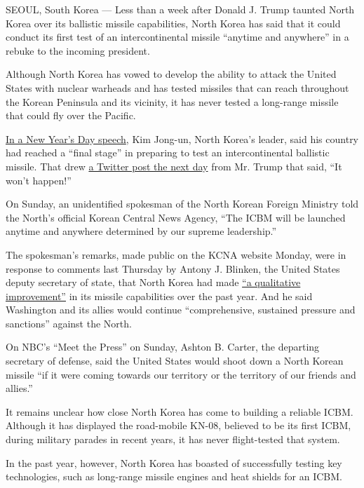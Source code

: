 SEOUL, South Korea --- Less than a week after Donald J. Trump taunted
North Korea over its ballistic missile capabilities, North Korea has
said that it could conduct its first test of an intercontinental missile
``anytime and anywhere'' in a rebuke to the incoming president.

Although North Korea has vowed to develop the ability to attack the
United States with nuclear warheads and has tested missiles that can
reach throughout the Korean Peninsula and its vicinity, it has never
tested a long-range missile that could fly over the Pacific.

\href{http://www.nytimes3xbfgragh.onion/2017/01/01/world/asia/north-korea-intercontinental-ballistic-missile-test-kim-jong-un.html}{In
a New Year's Day speech}, Kim Jong-un, North Korea's leader, said his
country had reached a ``final stage'' in preparing to test an
intercontinental ballistic missile. That drew
\href{http://www.nytimes3xbfgragh.onion/2017/01/02/world/asia/trump-twitter-north-korea-missiles-china.html}{a
Twitter post the next day} from Mr. Trump that said, ``It won't
happen!''

On Sunday, an unidentified spokesman of the North Korean Foreign
Ministry told the North's official Korean Central News Agency, ``The
ICBM will be launched anytime and anywhere determined by our supreme
leadership.''

The spokesman's remarks, made public on the KCNA website Monday, were in
response to comments last Thursday by Antony J. Blinken, the United
States deputy secretary of state, that North Korea had made
\href{https://www.state.gov/s/d/2017d/266602.htm}{``a qualitative
improvement''} in its missile capabilities over the past year. And he
said Washington and its allies would continue ``comprehensive, sustained
pressure and sanctions'' against the North.

On NBC's ``Meet the Press'' on Sunday, Ashton B. Carter, the departing
secretary of defense, said the United States would shoot down a North
Korean missile ``if it were coming towards our territory or the
territory of our friends and allies.''

It remains unclear how close North Korea has come to building a reliable
ICBM. Although it has displayed the road-mobile KN-08, believed to be
its first ICBM, during military parades in recent years, it has never
flight-tested that system.

In the past year, however, North Korea has boasted of successfully
testing key technologies, such as long-range missile engines and heat
shields for an ICBM.

